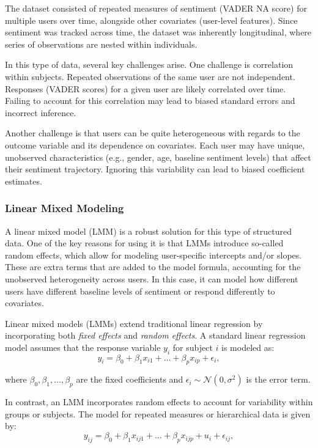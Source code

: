 The dataset consisted of repeated measures of sentiment (VADER NA score) for multiple users over time, alongside other covariates (user-level features). Since sentiment was tracked across time, the dataset was inherently longitudinal, where series of observations are nested within individuals.

In this type of data, several key challenges arise. One challenge is correlation within subjects. Repeated observations of the same user are not independent. Responses (VADER scores) for a given user are likely correlated over time. Failing to account for this correlation may lead to biased standard errors and incorrect inference. 

Another challenge is that users can be quite heterogeneous with regards to the outcome variable and its dependence on covariates. Each user may have unique, unobserved characteristics (e.g., gender, age, baseline sentiment levels) that affect their sentiment trajectory. Ignoring this variability can lead to biased coefficient estimates.

\subsubsection{Linear Mixed Modeling}

A linear mixed model (LMM) is a robust solution for this type of structured data. One of the key reasons for using it is that LMMs introduce so-called random effects, which allow for modeling user-specific intercepts and/or slopes. These are extra terms that are added to the model formula, accounting for the unobserved heterogeneity across users. In this case, it can model how different users have different baseline levels of sentiment or respond differently to covariates.

Linear mixed models (LMMs) extend traditional linear regression by incorporating both \textit{fixed effects} and \textit{random effects}. A standard linear regression model assumes that the response variable $y_i$ for subject $i$ is modeled as:
\begin{equation}
    y_i = \beta_0 + \beta_1 x_{i1} + \dots + \beta_p x_{ip} + \epsilon_i,
\end{equation}

where $\beta_0, \beta_1, \dots, \beta_p$ are the fixed coefficients and $\epsilon_i \sim \mathcal{N}(0, \sigma^2)$ is the error term.

In contrast, an LMM incorporates random effects to account for variability within groups or subjects. The model for repeated measures or hierarchical data is given by:
\begin{equation}
    y_{ij} = \beta_0 + \beta_1 x_{ij1} + \dots + \beta_p x_{ijp} + u_i + \epsilon_{ij},
\end{equation}

